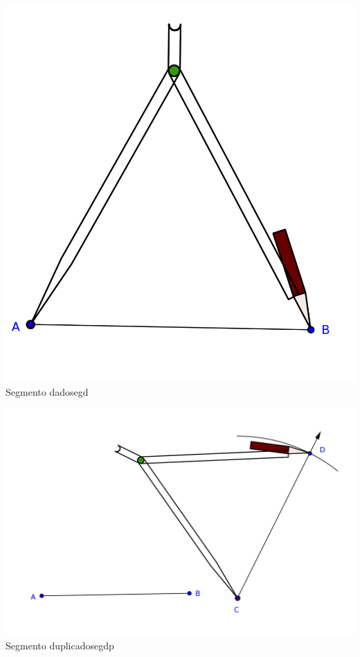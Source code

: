  \begin{figura}{
 \includegraphics[scale=0.4]{./compas1.png}
}{Segmento dado}{segd}
 \end{figura}
\hfill
 \begin{figura}{
 \includegraphics[scale=0.4]{./compas2.png}
}{Segmento duplicado}{segdp}
\end{figura}
